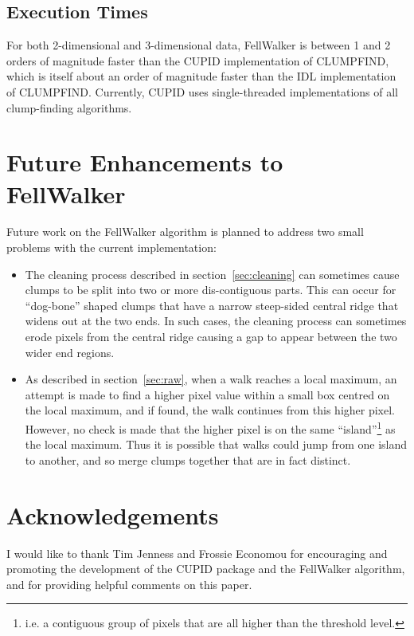 \documentclass[final,authoryear,5p,times,twocolumn]{elsarticle}
\begin{document}
\subsection{Execution Times}
For both 2-dimensional and 3-dimensional data, FellWalker is between 1 and
2 orders of magnitude faster than the CUPID implementation of CLUMPFIND,
which is itself about an order of magnitude faster than the IDL
implementation of CLUMPFIND. Currently, CUPID uses single-threaded
implementations of all clump-finding algorithms.

\section{Future Enhancements to FellWalker}
Future work on the FellWalker algorithm is planned to address two small
problems with the current implementation:

\begin{itemize}
\item The cleaning process described in section~\ref{sec:cleaning} can
sometimes cause clumps to be split into two or more dis-contiguous parts.
This can occur for ``dog-bone'' shaped clumps that have a narrow
steep-sided central ridge that widens out at the two ends. In such cases,
the cleaning process can sometimes erode pixels from the central ridge
causing a gap to appear between the two wider end regions.

\item As described in section~\ref{sec:raw}, when a walk reaches a local
maximum, an attempt is made to find a higher pixel value within a small
box centred on the local maximum, and if found, the walk continues from this
higher pixel. However, no check is made that the higher pixel is on the
same ``island''\footnote{i.e. a contiguous group of
pixels that are all higher than the threshold level.} as the local
maximum. Thus it is possible that walks could jump from one island to
another, and so merge clumps together that are in fact distinct.
\end{itemize}

\section{Acknowledgements}

I would like to thank Tim Jenness and Frossie Economou for encouraging
and promoting the development of the CUPID package and the FellWalker
algorithm, and for providing helpful comments on this paper.
\end{document}
